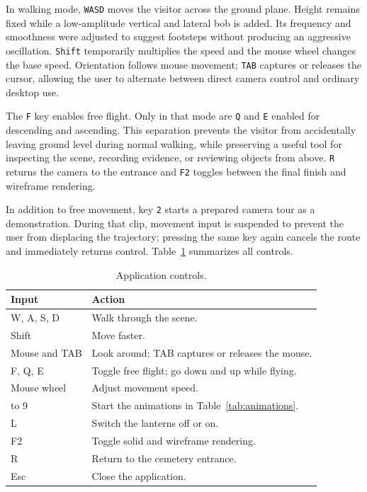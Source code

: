 \documentclass[letter,12pt]{article}
\begin{document}
	In walking mode, \texttt{WASD} moves the visitor across the ground plane. Height remains fixed while a low-amplitude vertical and lateral bob is added. Its frequency and smoothness were adjusted to suggest footsteps without producing an aggressive oscillation. \texttt{Shift} temporarily multiplies the speed and the mouse wheel changes the base speed. Orientation follows mouse movement; \texttt{TAB} captures or releases the cursor, allowing the user to alternate between direct camera control and ordinary desktop use.

	The \texttt{F} key enables free flight. Only in that mode are \texttt{Q} and \texttt{E} enabled for descending and ascending. This separation prevents the visitor from accidentally leaving ground level during normal walking, while preserving a useful tool for inspecting the scene, recording evidence, or reviewing objects from above. \texttt{R} returns the camera to the entrance and \texttt{F2} toggles between the final finish and wireframe rendering.

	In addition to free movement, key \texttt{2} starts a prepared camera tour as a demonstration. During that clip, movement input is suspended to prevent the user from displacing the trajectory; pressing the same key again cancels the route and immediately returns control. Table~\ref{tab:controls} summarizes all controls.

	\begin{table}[H]
		\centering
		\small
		\begin{tabular}{>{\centering\arraybackslash}p{3.8cm}p{9cm}}
			\toprule
			\textbf{Input} & \textbf{Action}\\
			\midrule
			W, A, S, D & Walk through the scene. \\
			Shift & Move faster. \\
			Mouse and TAB & Look around; TAB captures or releases the mouse. \\
			F, Q, E & Toggle free flight; go down and up while flying. \\
			Mouse wheel & Adjust movement speed. \\
			1 to 9 & Start the animations in Table~\ref{tab:animations}. \\
			L & Switch the lanterns off or on. \\
			F2 & Toggle solid and wireframe rendering. \\
			R & Return to the cemetery entrance. \\
			Esc & Close the application. \\
			\bottomrule
		\end{tabular}
		\caption{Application controls.}
		\label{tab:controls}
	\end{table}
\end{document}
